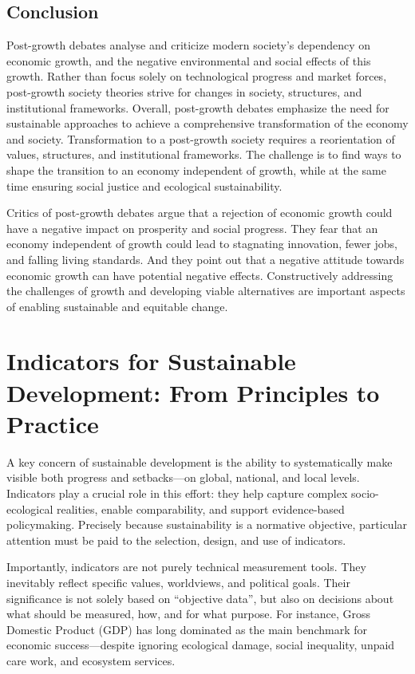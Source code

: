 \documentclass[
  a4paper,
  openany]{book}
\begin{document}
\subsection{Conclusion}\label{conclusion-4}

Post-growth debates analyse and criticize modern society's dependency on
economic growth, and the negative environmental and social effects of
this growth. Rather than focus solely on technological progress and
market forces, post-growth society theories strive for changes in
society, structures, and institutional frameworks. Overall, post-growth
debates emphasize the need for sustainable approaches to achieve a
comprehensive transformation of the economy and society. Transformation
to a post-growth society requires a reorientation of values, structures,
and institutional frameworks. The challenge is to find ways to shape the
transition to an economy independent of growth, while at the same time
ensuring social justice and ecological sustainability.

Critics of post-growth debates argue that a rejection of economic growth
could have a negative impact on prosperity and social progress. They
fear that an economy independent of growth could lead to stagnating
innovation, fewer jobs, and falling living standards. And they point out
that a negative attitude towards economic growth can have potential
negative effects. Constructively addressing the challenges of growth and
developing viable alternatives are important aspects of enabling
sustainable and equitable change.

\section{\texorpdfstring{\textbf{Indicators for Sustainable Development:
From Principles to
Practice}}{Indicators for Sustainable Development: From Principles to Practice}}\label{indicators-for-sustainable-development-from-principles-to-practice}

A key concern of sustainable development is the ability to
systematically make visible both progress and setbacks---on global,
national, and local levels. Indicators play a crucial role in this
effort: they help capture complex socio-ecological realities, enable
comparability, and support evidence-based policymaking. Precisely
because sustainability is a normative objective, particular attention
must be paid to the selection, design, and use of indicators.

Importantly, indicators are not purely technical measurement tools. They
inevitably reflect specific values, worldviews, and political goals.
Their significance is not solely based on ``objective data'', but also
on decisions about what should be measured, how, and for what purpose.
For instance, Gross Domestic Product (GDP) has long dominated as the
main benchmark for economic success---despite ignoring ecological
damage, social inequality, unpaid care work, and ecosystem services.
\end{document}
